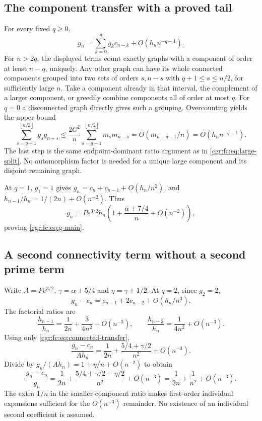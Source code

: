\documentclass[11pt,letterpaper]{article}
\numberwithin{equation}{section}
\theoremstyle{definition}\newtheorem{definition}[theorem]{Definition}
\theoremstyle{remark}\newtheorem{remark}[theorem]{Remark}
\newcommand{\floor}[1]{\left\lfloor #1\right\rfloor}
\begin{document}
\subsection{The component transfer with a proved tail}
For every fixed $q\ge0$,
\begin{equation}\label{cgr:fc:eq:component-transfer}
 g_n=\sum_{k=0}^qg_kc_{n-k}+O(h_n n^{-q-1}).
\end{equation}
For $n>2q$, the displayed terms count exactly graphs with a
component of order at least $n-q$, uniquely. Any other graph can
have its whole connected components grouped into two sets of
orders $s,n-s$ with $q+1\le s\le n/2$, for sufficiently large
$n$. Take a component already in that interval, the complement
of a larger component, or greedily combine components all of
order at most $q$. For $q=0$ a disconnected graph directly gives
such a grouping. Overcounting yields the upper bound
\[
 \sum_{s=q+1}^{\floor{n/2}}g_sg_{n-s}
 \le\frac{2C^2}{n}\sum_{s=q+1}^{\floor{n/2}}m_sm_{n-s}
 =O(m_{n-q-1}/n)=O(h_n n^{-q-1}).
\]
The last step is the same endpoint-dominant ratio argument as in
\eqref{cgr:fc:eq:large-split}. No automorphism factor is needed for a
unique large component and its disjoint remaining graph.

At $q=1$, $g_1=1$ gives
$g_n=c_n+c_{n-1}+O(h_n/n^2)$, and
$h_{n-1}/h_n=1/(2n)+O(n^{-2})$. Thus
\begin{equation}\label{cgr:fc:eq:all-transfer}
 g_n=P e^{3/2}h_n
       \left(1+\frac{\alpha+7/4}{n}+O(n^{-2})\right),
\end{equation}
proving \eqref{cgr:fc:eq:g-main}.

\subsection{A second connectivity term without a second prime term}
Write $A=P e^{3/2}$, $\gamma=\alpha+5/4$ and
$\eta=\gamma+1/2$. At $q=2$, since $g_2=2$,
\[
 g_n-c_n=c_{n-1}+2c_{n-2}+O(h_n/n^3).
\]
The factorial ratios are
\[
 \frac{h_{n-1}}{h_n}=\frac1{2n}+\frac3{4n^2}+O(n^{-3}),
 \qquad \frac{h_{n-2}}{h_n}=\frac1{4n^2}+O(n^{-3}).
\]
Using only \eqref{cgr:fc:eq:connected-transfer},
\[
 \frac{g_n-c_n}{A h_n}
 =\frac1{2n}+\frac{5/4+\gamma/2}{n^2}+O(n^{-3}).
\]
Divide by $g_n/(A h_n)=1+\eta/n+O(n^{-2})$ to obtain
\[
 \frac{g_n-c_n}{g_n}
 =\frac1{2n}+\frac{5/4+\gamma/2-\eta/2}{n^2}+O(n^{-3})
 =\frac1{2n}+\frac1{n^2}+O(n^{-3}).
\]
The extra $1/n$ in the smaller-component ratio makes first-order
individual expansions sufficient for the $O(n^{-3})$ remainder.
No existence of an individual second coefficient is assumed.
\end{document}
